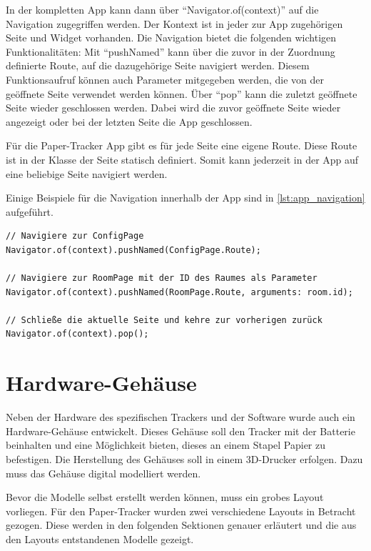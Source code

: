 In der kompletten App kann dann über \enquote{Navigator.of(context)} auf die Navigation zugegriffen werden.
Der Kontext ist in jeder zur App zugehörigen Seite und Widget vorhanden.
Die Navigation bietet die folgenden wichtigen Funktionalitäten:
Mit \enquote{pushNamed} kann über die zuvor in der Zuordnung definierte Route, auf die dazugehörige Seite navigiert werden.
Diesem Funktionsaufruf können auch Parameter mitgegeben werden, die von der geöffnete Seite verwendet werden können.
Über \enquote{pop} kann die zuletzt geöffnete Seite wieder geschlossen werden.
Dabei wird die zuvor geöffnete Seite wieder angezeigt oder bei der letzten Seite die App geschlossen.

Für die Paper-Tracker App gibt es für jede Seite eine eigene Route.
Diese Route ist in der Klasse der Seite statisch definiert.
Somit kann jederzeit in der App auf eine beliebige Seite navigiert werden.

Einige Beispiele für die Navigation innerhalb der App sind in \autoref{lst:app_navigation} aufgeführt.

\begin{lstlisting}[caption={Beispiele für die Navigation innerhalb der App},label={lst:app_navigation},tabsize=2]
// Navigiere zur ConfigPage
Navigator.of(context).pushNamed(ConfigPage.Route);

// Navigiere zur RoomPage mit der ID des Raumes als Parameter
Navigator.of(context).pushNamed(RoomPage.Route, arguments: room.id);

// Schließe die aktuelle Seite und kehre zur vorherigen zurück
Navigator.of(context).pop();
\end{lstlisting}

\section{Hardware-Gehäuse}

Neben der Hardware des spezifischen Trackers und der Software wurde auch ein Hardware-Gehäuse entwickelt.
Dieses Gehäuse soll den Tracker mit der Batterie beinhalten und eine Möglichkeit bieten, dieses an einem Stapel Papier zu befestigen.
Die Herstellung des Gehäuses soll in einem 3D-Drucker erfolgen.
Dazu muss das Gehäuse digital modelliert werden.

Bevor die Modelle selbst erstellt werden können, muss ein grobes Layout vorliegen.
Für den Paper-Tracker wurden zwei verschiedene Layouts in Betracht gezogen.
Diese werden in den folgenden Sektionen genauer erläutert und die aus den Layouts entstandenen Modelle gezeigt.

